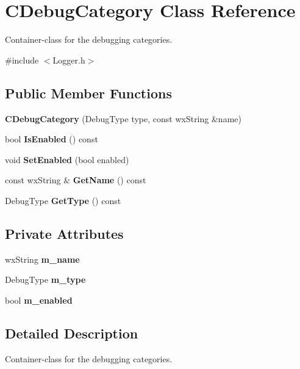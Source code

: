 \section{CDebugCategory Class Reference}
\label{classCDebugCategory}


Container-\/class for the debugging categories.  


{\ttfamily \#include $<$Logger.h$>$}\subsection*{Public Member Functions}
\begin{DoxyCompactItemize}
\item 
{\bf CDebugCategory} (DebugType type, const wxString \&name)
\item 
bool {\bf IsEnabled} () const \label{classCDebugCategory_af9a2ccf49812519d4618542d82043e72}

\item 
void {\bf SetEnabled} (bool enabled)\label{classCDebugCategory_a2effdc20204b47e4c4fdf267a9557aaf}

\item 
const wxString \& {\bf GetName} () const \label{classCDebugCategory_a78e1c65d8e571896eb64b0ce293cb1a7}

\item 
DebugType {\bf GetType} () const \label{classCDebugCategory_a08ba35d0df947daebfd70fb7bfd46869}

\end{DoxyCompactItemize}
\subsection*{Private Attributes}
\begin{DoxyCompactItemize}
\item 
wxString {\bf m\_\-name}\label{classCDebugCategory_a6388128c8cd674ae93a0fbf773974275}

\item 
DebugType {\bf m\_\-type}\label{classCDebugCategory_a5dc117afe17f8402e11a5f3e66047d6e}

\item 
bool {\bf m\_\-enabled}\label{classCDebugCategory_a30fdf6d6864ad6d7b0f10c55b86f496c}

\end{DoxyCompactItemize}


\subsection{Detailed Description}
Container-\/class for the debugging categories. 

